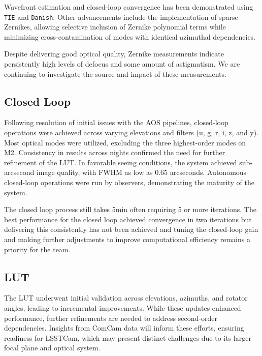 Wavefront estimation and closed-loop convergence has been demonstrated using \texttt{TIE} and \texttt{Danish}. Other advancements include the implementation of sparse Zernikes,  allowing selective inclusion of Zernike polynomial terms while minimizing cross-contamination 
of modes with identical azimuthal dependencies.

Despite delivering good optical quality, Zernike measurements indicate persistently high levels of defocus and some amount of astigmatism. We are continuing to investigate the source and impact of these measurements.

\subsection{Closed Loop}
Following resolution of initial issues with the AOS pipelines,  closed-loop operations were achieved across varying elevations and filters (u, g, r, i, z, and y).  Most optical modes were utilized, excluding the three highest-order modes on M2.  Consistency in results across nights confirmed the need for further refinement of the LUT. In favorable seeing conditions, the system achieved sub-arcsecond image quality, with FWHM as low as 0.65 arcseconds. Autonomous closed-loop operations were run by observers, demonstrating the maturity of the system. 


The closed loop process still takes 5min  often requiring 5 or more iterations. The best performance for the closed loop achieved convergence in two iterations but delivering this consistently has not been achieved and tuning the closed-loop gain and making further adjustments to improve computational  efficiency remains a priority for the team.

\subsection{LUT}
The LUT underwent initial validation across elevations, azimuths, and rotator angles, 
leading to incremental improvements. While these updates enhanced performance, 
further refinements are needed to address second-order dependencies. Insights 
from ComCam data will inform these efforts, ensuring readiness for LSSTCam, which 
may present distinct challenges due to its larger focal plane and optical system.




